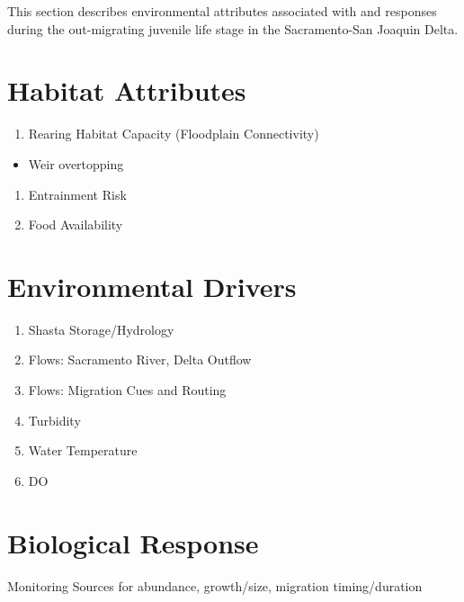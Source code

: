 \documentclass[
]{book}
\providecommand{\tightlist}{%
  \setlength{\itemsep}{0pt}\setlength{\parskip}{0pt}}
\theoremstyle{definition}
\theoremstyle{definition}
\theoremstyle{definition}
\theoremstyle{definition}
\theoremstyle{remark}
\begin{document}
This section describes environmental attributes associated with and responses during the out-migrating juvenile life stage in the Sacramento-San Joaquin Delta.

\hypertarget{habitat-attributes-4}{%
\section{Habitat Attributes}\label{habitat-attributes-4}}

\begin{enumerate}
\def\labelenumi{\arabic{enumi}.}
\tightlist
\item
  Rearing Habitat Capacity (Floodplain Connectivity)
\end{enumerate}

\begin{itemize}
\tightlist
\item
  Weir overtopping
\end{itemize}

\begin{enumerate}
\def\labelenumi{\arabic{enumi}.}
\setcounter{enumi}{1}
\item
  Entrainment Risk
\item
  Food Availability
\end{enumerate}

\hypertarget{environmental-drivers-3}{%
\section{Environmental Drivers}\label{environmental-drivers-3}}

\begin{enumerate}
\def\labelenumi{\arabic{enumi}.}
\item
  Shasta Storage/Hydrology
\item
  Flows: Sacramento River, Delta Outflow
\item
  Flows: Migration Cues and Routing
\item
  Turbidity
\item
  Water Temperature
\item
  DO
\end{enumerate}

\hypertarget{biological-response-4}{%
\section{Biological Response}\label{biological-response-4}}

Monitoring Sources for abundance, growth/size, migration timing/duration
\end{document}
